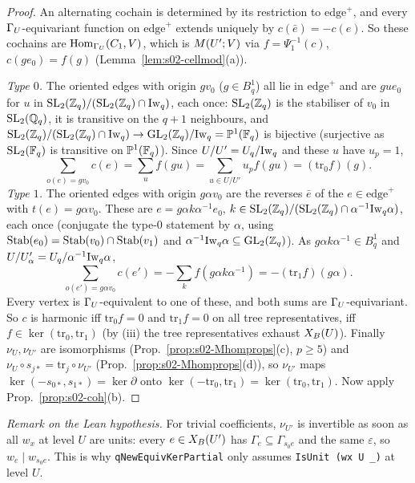 \begin{proof}
An alternating cochain is determined by its restriction to $\mathrm{edge}^+$, and every $\Gamma_U$-equivariant function on $\mathrm{edge}^+$ extends uniquely by
$c(\bar e)=-c(e)$. So these cochains are $\operatorname{Hom}_{\Gamma_U}(C_1,V)$, which is $M(U';V)$ via $f=\Psi_1^{-1}(c)$, $c(ge_0)=f(g)$ (Lemma~\ref{lem:s02-cellmod}(a)).

\emph{Type $0$.} The oriented edges with origin $gv_0$ ($g\in B^1_q$) all lie in $\mathrm{edge}^+$ and are $gue_0$ for $u$ in $\mathrm{SL}_2(\mathbb{Z}_q)/(\mathrm{SL}_2(\mathbb{Z}_q)\cap\mathrm{Iw}_q)$, each once:
$\mathrm{SL}_2(\mathbb{Z}_q)$ is the stabiliser of $v_0$ in $\mathrm{SL}_2(\mathbb{Q}_q)$, it is transitive on the $q+1$ neighbours, and $\mathrm{SL}_2(\mathbb{Z}_q)/(\mathrm{SL}_2(\mathbb{Z}_q)\cap\mathrm{Iw}_q)\to\mathrm{GL}_2(\mathbb{Z}_q)/\mathrm{Iw}_q=\mathbb P^1(\mathbb{F}_q)$ is
bijective (surjective as $\mathrm{SL}_2(\mathbb{F}_q)$ is transitive on $\mathbb P^1(\mathbb{F}_q)$). Since $U/U'=U_q/\mathrm{Iw}_q$ and these $u$ have $u_p=1$,
\[\sum_{o(e)=gv_0}c(e)=\sum_uf(gu)=\sum_{u\in U/U'}u_pf(gu)=(\mathrm{tr}_0f)(g).\]
\emph{Type $1$.} The oriented edges with origin $g\alpha v_0$ are the reverses $\bar e$ of the $e\in\mathrm{edge}^+$ with $t(e)=g\alpha v_0$. These are
$e=g\alpha k\alpha^{-1}e_0$, $k\in\mathrm{SL}_2(\mathbb{Z}_q)/(\mathrm{SL}_2(\mathbb{Z}_q)\cap\alpha^{-1}\mathrm{Iw}_q\alpha)$, each once (conjugate the type-$0$ statement by $\alpha$, using
$\operatorname{Stab}(e_0)=\operatorname{Stab}(v_0)\cap\operatorname{Stab}(v_1)$ and $\alpha^{-1}\mathrm{Iw}_q\alpha\subseteq\mathrm{GL}_2(\mathbb{Z}_q)$). As $g\alpha k\alpha^{-1}\in B^1_q$ and $U/U'_\alpha=U_q/\alpha^{-1}\mathrm{Iw}_q\alpha$,
\[\sum_{o(e')=g\alpha v_0}c(e')=-\sum_kf(g\alpha k\alpha^{-1})=-(\mathrm{tr}_1f)(g\alpha).\]
Every vertex is $\Gamma_U$-equivalent to one of these, and both sums are $\Gamma_U$-equivariant. So $c$ is harmonic iff $\mathrm{tr}_0f=0$ and $\mathrm{tr}_1f=0$ on all tree
representatives, iff $f\in\ker(\mathrm{tr}_0,\mathrm{tr}_1)$ (by (iii) the tree representatives exhaust $X_B(U)$). Finally $\nu_U,\nu_{U'}$ are isomorphisms
(Prop.~\ref{prop:s02-Mhomprops}(c), $p\ge5$) and $\nu_U\circ s_{j*}=\mathrm{tr}_j\circ\nu_{U'}$ (Prop.~\ref{prop:s02-Mhomprops}(d)), so $\nu_{U'}$ maps
$\ker(-s_{0*},s_{1*})=\ker\partial$ onto $\ker(-\mathrm{tr}_0,\mathrm{tr}_1)=\ker(\mathrm{tr}_0,\mathrm{tr}_1)$. Now apply Prop.~\ref{prop:s02-coh}(b).
\end{proof}
\noindent\emph{Remark on the Lean hypothesis.} For trivial coefficients, $\nu_{U'}$ is invertible as soon as all $w_x$ at level $U$ are units: every
$e\in X_B(U')$ has $\Gamma_e\subseteq\Gamma_{s_0e}$ and the same $\varepsilon$, so $w_e\mid w_{s_0e}$. This is why \texttt{qNewEquivKerPartial} only assumes
\texttt{IsUnit (wx U \_)} at level $U$.

